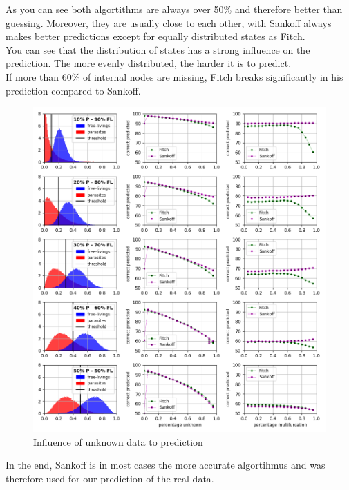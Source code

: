       As you can see both algortithms are always over 50\% and therefore better than guessing. Moreover, 
        they are usually close to each other, with Sankoff always makes better predictions except for 
        equally distributed states as Fitch. \\
      You can see that the distribution of states has a strong influence on the prediction. The more 
        evenly distributed, the harder it is to predict. \\
      If more than 60\% of internal nodes are missing, Fitch breaks significantly in his prediction 
        compared to Sankoff.
      
      \begin{figure}
        \centering
        \includegraphics[trim = 0mm 0mm 0mm 0mm, clip, width=\textwidth]{Figures/simulation_evaluation_1.png}
        \caption{Influence of unknown data to prediction}
        \label{fig:influence of unknown data}
      \end{figure}

      In the end, Sankoff is in most cases the more accurate algortihmus and was therefore used for our 
        prediction of the real data.

